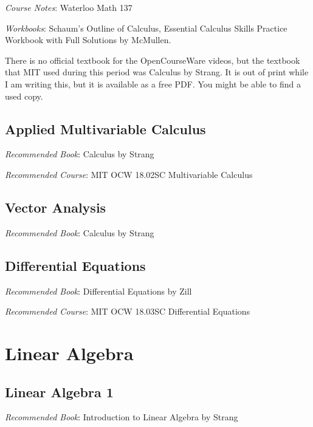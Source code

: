 \documentclass[openany,10pt]{book}
\begin{document}
\noindent \textit{Course Notes}: Waterloo Math 137

\noindent \textit{Workbooks}: Schaum's Outline of Calculus, Essential Calculus Skills Practice Workbook with Full Solutions by McMullen.

\noindent There is no official textbook for the OpenCourseWare videos, but the textbook that MIT used during this period was Calculus by Strang.  It is out of print while I am writing this, but it is available as a free PDF.  You might be able to find a used copy.

\chapter{Applied Multivariable Calculus}

\textit{Recommended Book}: Calculus by Strang \newline

\noindent \textit{Recommended Course}: MIT OCW 18.02SC Multivariable Calculus \newline

\chapter{Vector Analysis}

\textit{Recommended Book}: Calculus by Strang\newline

\chapter{Differential Equations}

\textit{Recommended Book}: Differential Equations by Zill\newline

\noindent \textit{Recommended Course}: MIT OCW 18.03SC Differential Equations\newline

\part{Linear Algebra}

\chapter{Linear Algebra 1}

\textit{Recommended Book}: Introduction to Linear Algebra by Strang\newline
\end{document}
